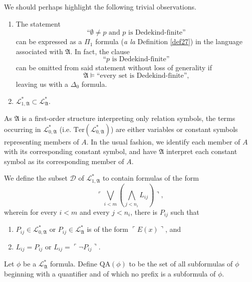 \documentclass[12pt]{article}
\numberwithin{equation}{section}
\begin{document}
We should perhaps highlight the following trivial observations. 
\begin{enumerate}[label=(\Roman*)]
    \item\label{s31I} The statement $$\text{``}\emptyset \neq p \text{ and } p \text{ is Dedekind-finite''}$$ can be expressed as a $\Pi_1$ formula (\emph{a la} Definition \ref{def27}) in the language associated with $\mathfrak{A}$. In fact, the clause $$\text{``} p \text{ is Dedekind-finite''}$$ can be omitted from said statement without loss of generality if 
    \begin{equation*}
        \mathfrak{A} \models \text{``every set is Dedekind-finite'',}
    \end{equation*}
    leaving us with a $\Delta_0$ formula.
    \item $\mathcal{L}^{*}_{1, \mathfrak{A}} \subset \mathcal{L}^{*}_{\mathfrak{A}}$.
\end{enumerate}

\begin{rem}
As $\mathfrak{A}$ is a first-order structure interpreting only relation symbols, the terms occurring in $\mathcal{L}^{*}_{0, \mathfrak{A}}$ (i.e. $\mathrm{Ter}(\mathcal{L}^{*}_{0, \mathfrak{A}})$) are either variables or constant symbols representing members of $A$. In the usual fashion, we identify each member of $A$ with its corresponding constant symbol, and have $\mathfrak{A}$ interpret each constant symbol as its corresponding member of $A$.
\end{rem}

\begin{defi}
We define the subset $\mathcal{D}$ of $\mathcal{L}^{*}_{1, \mathfrak{A}}$ to contain formulas of the form $$\ulcorner \bigvee_{i < m} (\bigwedge_{j < n_i} L_{ij}) \urcorner,$$ wherein for every $i < m$ and every $j < n_i$, there is $P_{ij}$ such that
\begin{enumerate}[label=(\alph*)]
    \item $P_{ij} \in \mathcal{L}^{*}_{0, \mathfrak{A}}$ or $P_{ij} \in \mathcal{L}^{*}_{\mathfrak{A}}$ is of the form $\ulcorner E(x) \urcorner$, and 
    \item $L_{ij} = P_{ij}$ or $L_{ij} = \ulcorner \neg P_{ij} \urcorner$.
\end{enumerate}
\end{defi}

\begin{defi}
Let $\phi$ be a $\mathcal{L}^{*}_{\mathfrak{A}}$ formula. Define $\mathrm{QA}(\phi)$ to be the set of all subformulas of $\phi$ beginning with a quantifier and of which no prefix is a subformula of $\phi$.
\end{defi}
\end{document}
